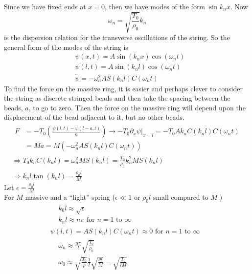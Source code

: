 \documentclass[twoside,10pt]{amsart}
\newcommand{\problemhead}[1]
  {\smallskip
   \noindent{\large\bf Problem #1.}
   \smallskip}
\begin{document}
\problemhead{7.2} Since we have fixed ends at $x=0$, then we have modes of the form $\sin{k_n x}$.  Now 
\[
\omega_n = \sqrt{ \frac{ T_0}{\rho_0} } k_n
\]
is the dispersion relation for the transverse oscillations of the string.  So the general form of the modes of the string is
\[
\begin{aligned}
  & \psi(x,t) = A \sin{(k_n x) } \cos{ (\omega_n t) } \\
  & \psi(l,t) = A \sin{(k_n l)} \cos{ (\omega_n t) } \\
  & \ddot{\psi} = -\omega_n^2 A S(k_n l)C(\omega_n t)
\end{aligned}
\]
To find the force on the massive ring, it is easier and perhaps clever to consider the string as discrete stringed beads and then take the spacing between the beads, $a$, to go to zero.  Then the force on the massive ring will depend upon the displacement of the bead adjacent to it, but no other beads.  
\[
\begin{gathered}
  \begin{aligned}
    F & = -T_0 \left( \frac{ \psi(l,t) - \psi(l-a,t) }{ a} \right) \to \left. -T_0 \partial_x \psi \right|_{x=l} = -T_0 A k_n C(k_n l)C(\omega_n t) \\
    & = M a = M(-\omega_n^2 A S(k_n l)C(\omega_n t) ) 
  \end{aligned} \\
  \Longrightarrow T_0 k_n C(k_n l) = \omega_n^2 M S(k_n l) = \frac{T_0}{\rho_0} k_n^2 M S(k_n l) \\
\Longrightarrow   k_n l \tan{(k_n l)} = \frac{\rho_0 l }{ M} 
\end{gathered}
\]
Let $\epsilon = \frac{ \rho_0 l}{M}$ \medskip \\
For $M$ massive and a ``light'' spring ($\epsilon \ll 1$ or $\rho_0 l$ small compared to $M$ ) \\
\[
\begin{gathered}
  \begin{aligned}
    & k_0 l \approx \sqrt{ \epsilon } \\
    & k_n l \approx n \pi \text{ for $n=1$ to $\infty$ } 
  \end{aligned} \\
\psi(l,t) = A S(k_n l) C(\omega_n t) \approx 0 \text{ for $n=1$ to $\infty$ } \\
\begin{aligned}
  & \omega_n \approx \frac{ n\pi }{ l } \sqrt{ \frac{T_0}{\rho_0 } }  \\
  & \omega_0 \approx \sqrt{ \frac{ T_0}{\rho }} \frac{1}{l} \sqrt{ \frac{ \rho l}{M} } = \sqrt{ \frac{T_0}{ l M } }
\end{aligned}
\end{gathered}
\]
\end{document}
